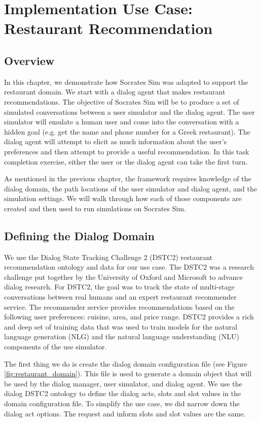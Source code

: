 \chapter{Implementation Use Case:  Restaurant Recommendation }
\label{chap:restaurant}
\section{Overview}

In this chapter, we demonstrate how Socrates Sim was adapted to support the restaurant domain. We start with a dialog agent that makes restaurant recommendations. The objective of Socrates Sim will be to produce a set of simulated conversations between a user simulator and the dialog agent. The user simulator will emulate a human user and come into the conversation with a hidden goal (e.g. get the name and phone number for a Greek restaurant). The dialog agent will attempt to elicit as much information about the user's preferences and then attempt to provide a useful recommendation.  In this task completion exercise, either the user or the dialog agent can take the first turn. 

As mentioned in the previous chapter, the framework requires knowledge of the dialog domain, the path locations of the user simulator and dialog agent, and the simulation settings. We will walk through how each of those components are created and then used to run simulations on Socrates Sim.

\section{Defining the Dialog Domain}

We use the Dialog State Tracking Challenge 2 (DSTC2) restaurant recommendation ontology and data for our use case. The DSTC2 was a research challenge put together by the University of Oxford and Microsoft to advance dialog research. For DSTC2, the goal was to track the state of multi-stage conversations between real humans and an expert restaurant recommender service. The recommender service provides recommendations based on the following user preferences: cuisine, area, and price range. DSTC2 provides a rich and deep set of training data that was used to train models for the natural language generation (NLG) and the natural language understanding (NLU) components of the use simulator.

The first thing we do is create the dialog domain configuration file (see Figure \ref{fig:restaurant_domain}). This file is used to generate a domain object that will be used by the dialog manager, user simulator, and dialog agent. We use the dialog DSTC2 ontology to define the dialog acts, slots and slot values in the domain configuration file. To simplify the use case, we did narrow down the dialog act options. The request and inform slots and slot values are the same. 

